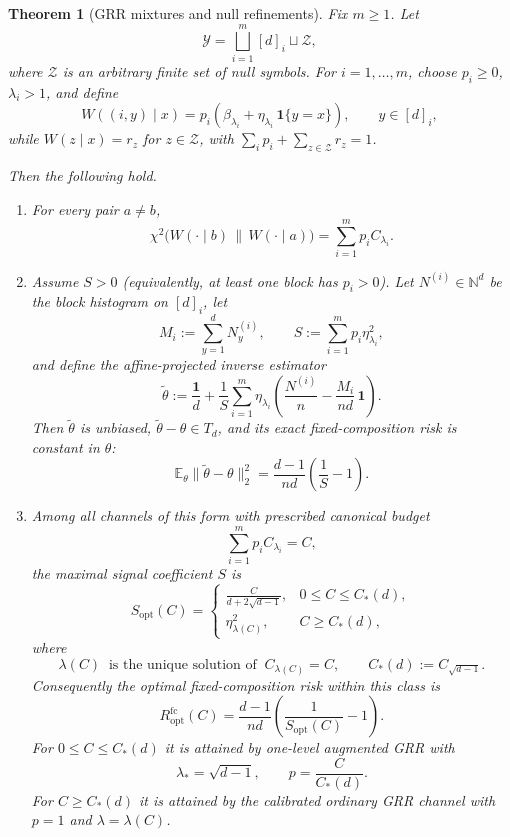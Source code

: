 \documentclass[10pt,a4paper]{amsart}
\newtheorem{theorem}{Theorem}
\newcommand{\E}{\mathbb E}
\newcommand{\N}{\mathbb N}
\newcommand{\one}{\mathbf 1}
\begin{document}
\begin{theorem}[GRR mixtures and null refinements]\label{thm:grr-mixtures}
Fix \(m\ge 1\).  Let
\[
\mathcal Y=\bigsqcup_{i=1}^m [d]_i \sqcup \mathcal Z,
\]
where \(\mathcal Z\) is an arbitrary finite set of null symbols.
For \(i=1,\dots,m\), choose \(p_i\ge 0\), \(\lambda_i>1\), and define
\[
W((i,y)\mid x)
=
p_i\left(
\beta_{\lambda_i}+\eta_{\lambda_i}\,\one\{y=x\}
\right),
\qquad
y\in[d]_i,
\]
while \(W(z\mid x)=r_z\) for \(z\in\mathcal Z\), with \(\sum_i p_i+\sum_{z\in\mathcal Z}r_z=1\).

Then the following hold.

\begin{enumerate}[label=\textup{(\roman*)}]
\item For every pair \(a\neq b\),
\[
\chi^2\!\bigl(W(\cdot\mid b)\,\|\,W(\cdot\mid a)\bigr)
=
\sum_{i=1}^m p_i C_{\lambda_i}. \tag{10.2}\label{eq:mix-chi}
\]

\item Assume \(S>0\) (equivalently, at least one block has \(p_i>0\)).
Let \(N^{(i)}\in\N^d\) be the block histogram on \([d]_i\), let
\[
M_i:=\sum_{y=1}^d N_y^{(i)},
\qquad
S:=\sum_{i=1}^m p_i\eta_{\lambda_i}^2,
\]
and define the affine-projected inverse estimator
\[
\widetilde\theta
:=
\frac{\one}{d}
+
\frac{1}{S}\sum_{i=1}^m \eta_{\lambda_i}
\left(
\frac{N^{(i)}}{n}-\frac{M_i}{nd}\,\one
\right). \tag{10.3}\label{eq:mix-estimator}
\]
Then \(\widetilde\theta\) is unbiased, \(\widetilde\theta-\theta\in T_d\), and its exact
fixed-composition risk is constant in \(\theta\):
\[
\E_\theta\|\widetilde\theta-\theta\|_2^2
=
\frac{d-1}{nd}\left(\frac{1}{S}-1\right). \tag{10.4}\label{eq:mix-risk}
\]

\item Among all channels of this form with prescribed canonical budget
\[
\sum_{i=1}^m p_i C_{\lambda_i}=C,
\]
the maximal signal coefficient \(S\) is
\[
S_{\mathrm{opt}}(C)
=
\begin{cases}
\displaystyle \frac{C}{d+2\sqrt{d-1}}, & 0\le C\le C_\ast(d),\\[1.2ex]
\displaystyle \eta_{\lambda(C)}^2, & C\ge C_\ast(d),
\end{cases} \tag{10.5}\label{eq:S-frontier}
\]
where
\[
\lambda(C)\ \text{ is the unique solution of }\ C_{\lambda(C)}=C,
\qquad
C_\ast(d):=C_{\sqrt{d-1}}.
\]
Consequently the optimal fixed-composition risk within this class is
\[
R^{\mathrm{fc}}_{\mathrm{opt}}(C)
=
\frac{d-1}{nd}\left(\frac{1}{S_{\mathrm{opt}}(C)}-1\right). \tag{10.6}\label{eq:mix-opt-risk}
\]
For \(0\le C\le C_\ast(d)\) it is attained by one-level augmented GRR with
\[
\lambda_\ast=\sqrt{d-1},
\qquad
p=\frac{C}{C_\ast(d)}. \tag{10.7}\label{eq:opt-low-budget}
\]
For \(C\ge C_\ast(d)\) it is attained by the calibrated ordinary GRR channel with \(p=1\) and
\(\lambda=\lambda(C)\).
\end{enumerate}
\end{theorem}
\end{document}
